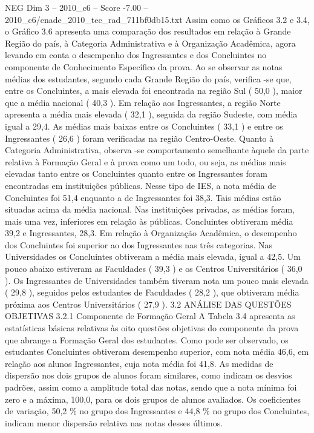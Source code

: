 \begin{textsample}{NEG Dim 3 – 2010\_c6 – Score -7.00 – 2010\_c6/enade\_2010\_tec\_rad\_711bf0db15.txt}
Assim como os Gráficos 3.2 e 3.4, o Gráfico 3.6 apresenta uma comparação dos resultados em relação à Grande Região do país, à Categoria Administrativa e à Organização Acadêmica, agora levando em conta o desempenho dos Ingressantes e dos Concluintes no componente de Conhecimento Específico da prova.
Ao se observar as notas médias dos estudantes, segundo cada Grande Região do país, verifica -se que, entre os Concluintes, a mais elevada foi encontrada na região Sul ( 50,0 ), maior que a média nacional ( 40,3 ).
Em relação aos Ingressantes, a região Norte apresenta a média mais elevada ( 32,1 ), seguida da região Sudeste, com média igual a 29,4.
As médias mais baixas entre os Concluintes ( 33,1 ) e entre os Ingressantes ( 26,6 ) foram verificadas na região Centro-Oeste.
Quanto à Categoria Administrativa, observa -se comportamento semelhante àquele da parte relativa à Formação Geral e à prova como um todo, ou seja, as médias mais elevadas tanto entre os Concluintes quanto entre os Ingressantes foram encontradas em instituições públicas.
Nesse tipo de IES, a nota média de Concluintes foi 51,4 enquanto a de Ingressantes foi 38,3.
Tais médias estão situadas acima da média nacional.
Nas instituições privadas, as médias foram, mais uma vez, inferiores em relação às públicas.
Concluintes obtiveram média 39,2 e Ingressantes, 28,3.
Em relação à Organização Acadêmica, o desempenho dos Concluintes foi superior ao dos Ingressantes nas três categorias.
Nas Universidades os Concluintes obtiveram a média mais elevada, igual a 42,5.
Um pouco abaixo estiveram as Faculdades ( 39,3 ) e os Centros Universitários ( 36,0 ).
Os Ingressantes de Universidades também tiveram nota um pouco mais elevada ( 29,8 ), seguidos pelos estudantes de Faculdades ( 28,2 ), que obtiveram média próxima aos Centros Universitários ( 27,9 ). 3.2 ANÁLISE DAS QUESTÕES OBJETIVAS 3.2.1 Componente de Formação Geral A Tabela 3.4 apresenta as estatísticas básicas relativas às oito questões objetivas do componente da prova que abrange a Formação Geral dos estudantes.
Como pode ser observado, os estudantes Concluintes obtiveram desempenho superior, com nota média 46,6, em relação aos alunos Ingressantes, cuja nota média foi 41,8.
As medidas de dispersão nos dois grupos de alunos foram similares, como indicam os desvios padrões, assim como a amplitude total das notas, sendo que a nota mínima foi zero e a máxima, 100,0, para os dois grupos de alunos avaliados.
Os coeficientes de variação, 50,2 \% no grupo dos Ingressantes e 44,8 \% no grupo dos Concluintes, indicam menor dispersão relativa nas notas desses últimos.

\end{textsample}
